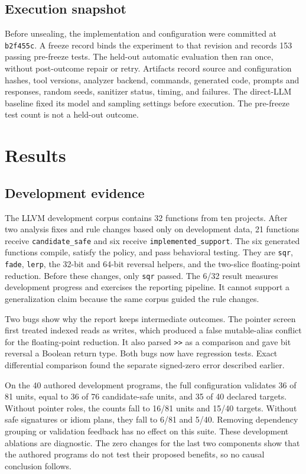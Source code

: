 \documentclass[conference]{IEEEtran}
\begin{document}
\subsection{Execution snapshot}

Before unsealing, the implementation and configuration were committed at
\texttt{b2f455c}. A freeze record binds the experiment to that revision and
records 153 passing pre-freeze tests. The held-out automatic evaluation then
ran once, without post-outcome repair or retry. Artifacts record source and
configuration hashes, tool versions, analyzer backend, commands, generated
code, prompts and responses, random seeds, sanitizer status, timing, and
failures. The direct-LLM baseline fixed its model and sampling settings before
execution. The pre-freeze test count is not a held-out outcome.

\section{Results}\label{sec:results}

\subsection{Development evidence}

The LLVM development corpus contains 32 functions from ten projects. After two
analysis fixes and rule changes based only on development data, 21 functions
receive \texttt{candidate\_safe} and six receive
\texttt{implemented\_support}. The six generated functions compile, satisfy
the policy, and pass behavioral testing. They are \texttt{sqr}, \texttt{fade},
\texttt{lerp}, the 32-bit and 64-bit reversal helpers, and the two-slice
floating-point reduction. Before these changes, only \texttt{sqr} passed. The
6/32 result measures development progress and exercises the reporting
pipeline. It cannot support a generalization claim because the same corpus
guided the rule changes.



Two bugs show why the report keeps intermediate outcomes. The pointer screen
first treated indexed reads as writes, which produced a false mutable-alias
conflict for the floating-point reduction. It also parsed \texttt{>>} as a
comparison and gave bit reversal a Boolean return type. Both bugs now have
regression tests. Exact differential comparison found the separate signed-zero
error described earlier.

On the 40 authored development programs, the full configuration validates 36
of 81 units, equal to 36 of 76 candidate-safe units, and 35 of 40 declared
targets. Without pointer roles, the counts fall to 16/81 units and 15/40
targets. Without safe signatures or idiom plans, they fall to 6/81 and 5/40.
Removing dependency grouping or validation feedback has no effect on this
suite. These development ablations are diagnostic. The zero changes for the
last two components show that the authored programs do not test their proposed
benefits, so no causal conclusion follows.
\end{document}
